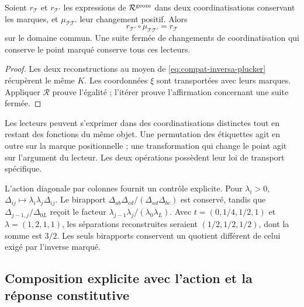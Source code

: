 \begin{corollary}
\label{cor:compat-mutaciones}
Soient \(r_{\mathcal T}\) et \(r_{\mathcal T'}\) les expressions de \(\mathcal R^{\rm geom}\) dans deux coordinatisations conservant les marques, et \(\mu_{\mathcal T\mathcal T'}\) leur changement positif. Alors
\[
 r_{\mathcal T'}\circ\mu_{\mathcal T\mathcal T'}
 =r_{\mathcal T}
\]
sur le domaine commun. Une suite fermée de changements de coordinatisation qui conserve le point marqué conserve tous ces lecteurs.
\end{corollary}
\begin{proof}
Les deux reconstructions au moyen de \eqref{eq:compat-inversa-plucker} récupèrent le même \(K\). Les coordonnées \(\xi\) sont transportées avec leurs marques. Appliquer \(\mathcal R\) prouve l'égalité ; l'itérer prouve l'affirmation concernant une suite fermée.
\end{proof}

Les lecteurs peuvent s'exprimer dans des coordinatisations distinctes tout en restant des fonctions du même objet. Une permutation des étiquettes agit en outre sur la marque positionnelle ; une transformation qui change le point agit sur l'argument du lecteur. Les deux opérations possèdent leur loi de transport spécifique.

L’action diagonale par colonnes fournit un contrôle explicite.
Pour \(\lambda_i>0\),
\(\Delta_{ij}\mapsto\lambda_i\lambda_j\Delta_{ij}\).
Le birapport \(\Delta_{ab}\Delta_{cd}/
(\Delta_{ad}\Delta_{bc})\) est conservé, tandis que
\(\Delta_{j-1,j}/\Delta_{0L}\) reçoit le facteur
\(\lambda_{j-1}\lambda_j/(\lambda_0\lambda_L)\).
Avec \(t=(0,1/4,1/2,1)\) et \(\lambda=(1,2,1,1)\), les
séparations reconstruites seraient \((1/2,1/2,1/2)\), dont la somme
est \(3/2\). Les seuls birapports conservent un quotient différent
de celui exigé par l’inverse marqué.

\subsection{Composition explicite avec l'action et la réponse constitutive}

